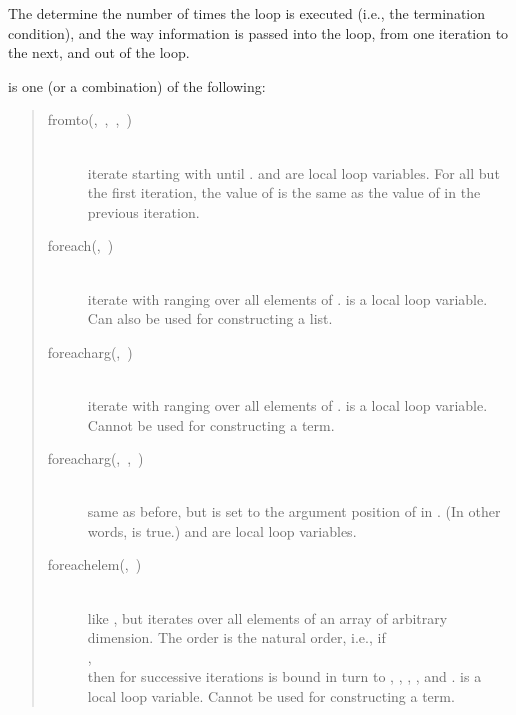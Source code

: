 The  determine the number of times the loop is executed
(i.e., the termination condition), and the way information is passed
into the loop, from one iteration to the next, and out of the loop.

 is one (or a combination) of the following:
\begin{quote}
\begin{description}
\item[fromto(,~,~,~)]%
\mbox{}\\
    iterate  starting with  until
    .
     and  are local loop variables.
    For all but the first iteration, the value of  is the same as the
    value of  in the previous iteration.

\item[foreach(,~)]%
\mbox{}\\
    iterate  with  ranging over all elements of
    .
     is a local loop variable.
    Can also be used for constructing a list.

\item[foreacharg(,~)]%
\mbox{}\\
    iterate  with  ranging over all elements of
    .
     is a local loop variable.
    Cannot be used for constructing a term.

\item[foreacharg(,~,~)]
\mbox{}\\
    same as before, but  is set to the argument position of 
    in . (In other words,  is true.)
     and  are local loop variables.

\item[foreachelem(,~)]%
\mbox{}\\
    like , but iterates over all elements of an array
    of arbitrary dimension.  The order is the natural order, i.e.,
    if\\
    \hbox{\hspace{2em}},\\
    then for successive
    iterations  is bound in turn to , , ,
    ,  and .
     is a local loop variable.
    Cannot be used for constructing a term.


\end{description}
\end{quote}

